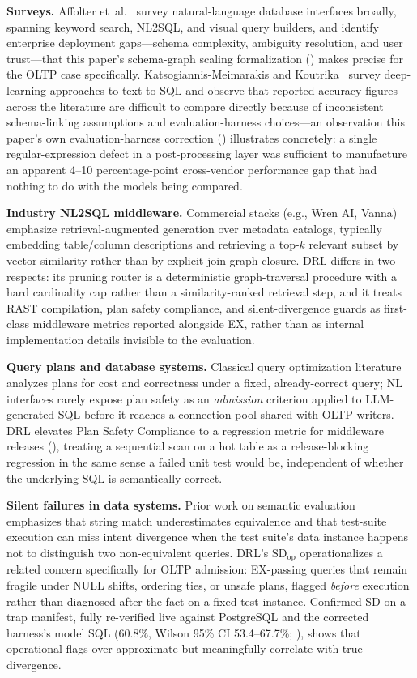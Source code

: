 \documentclass[twocolumn]{svjour3}
\begin{document}
\textbf{Surveys.}
Affolter et~al.~\cite{affolter2019comparative} survey natural-language database interfaces broadly, spanning keyword search, NL2SQL, and visual query builders, and identify enterprise deployment gaps---schema complexity, ambiguity resolution, and user trust---that this paper's schema-graph scaling formalization () makes precise for the OLTP case specifically.
Katsogiannis-Meimarakis and Koutrika~\cite{katsogiannis2023deep} survey deep-learning approaches to text-to-SQL and observe that reported accuracy figures across the literature are difficult to compare directly because of inconsistent schema-linking assumptions and evaluation-harness choices---an observation this paper's own evaluation-harness correction () illustrates concretely: a single regular-expression defect in a post-processing layer was sufficient to manufacture an apparent 4--10 percentage-point cross-vendor performance gap that had nothing to do with the models being compared.

\textbf{Industry NL2SQL middleware.}
Commercial stacks (e.g., Wren AI, Vanna) emphasize retrieval-augmented generation over metadata catalogs, typically embedding table/column descriptions and retrieving a top-$k$ relevant subset by vector similarity rather than by explicit join-graph closure.
DRL differs in two respects: its pruning router is a deterministic graph-traversal procedure with a hard cardinality cap rather than a similarity-ranked retrieval step, and it treats RAST compilation, plan safety compliance, and silent-divergence guards as first-class middleware metrics reported alongside EX, rather than as internal implementation details invisible to the evaluation.

\textbf{Query plans and database systems.}
Classical query optimization literature analyzes plans for cost and correctness under a fixed, already-correct query; NL interfaces rarely expose plan safety as an \emph{admission} criterion applied to LLM-generated SQL before it reaches a connection pool shared with OLTP writers.
DRL elevates Plan Safety Compliance to a regression metric for middleware releases (), treating a sequential scan on a hot table as a release-blocking regression in the same sense a failed unit test would be, independent of whether the underlying SQL is semantically correct.

\textbf{Silent failures in data systems.}
Prior work on semantic evaluation~\cite{finegan2018improving,zhong2020semantic} emphasizes that string match underestimates equivalence and that test-suite execution can miss intent divergence when the test suite's data instance happens not to distinguish two non-equivalent queries.
DRL's $\text{SD}_{\text{op}}$ operationalizes a related concern specifically for OLTP admission: EX-passing queries that remain fragile under NULL shifts, ordering ties, or unsafe plans, flagged \emph{before} execution rather than diagnosed after the fact on a fixed test instance.
Confirmed SD on a trap manifest, fully re-verified live against PostgreSQL and the corrected harness's model SQL (60.8\%, Wilson 95\% CI 53.4--67.7\%; ), shows that operational flags over-approximate but meaningfully correlate with true divergence.
\end{document}
